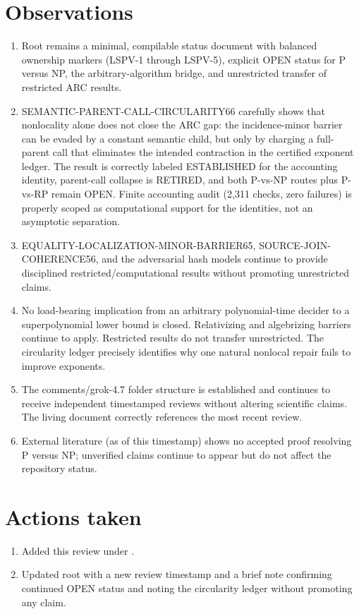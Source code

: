 \documentclass[11pt]{article}
\begin{document}
\section{Observations}
\begin{enumerate}
\item Root  remains a minimal, compilable status document with balanced ownership markers (LSPV-1 through LSPV-5), explicit OPEN status for P versus NP, the arbitrary-algorithm bridge, and unrestricted transfer of restricted ARC results.
\item SEMANTIC-PARENT-CALL-CIRCULARITY66 carefully shows that nonlocality alone does not close the ARC gap: the incidence-minor barrier can be evaded by a constant semantic child, but only by charging a full-parent call that eliminates the intended contraction in the certified exponent ledger. The result is correctly labeled ESTABLISHED for the accounting identity, parent-call collapse is RETIRED, and both P-vs-NP routes plus P-vs-RP remain OPEN. Finite accounting audit (2,311 checks, zero failures) is properly scoped as computational support for the identities, not an asymptotic separation.
\item EQUALITY-LOCALIZATION-MINOR-BARRIER65, SOURCE-JOIN-COHERENCE56, and the adversarial hash models continue to provide disciplined restricted/computational results without promoting unrestricted claims.
\item No load-bearing implication from an arbitrary polynomial-time decider to a superpolynomial lower bound is closed. Relativizing and algebrizing barriers continue to apply. Restricted results do not transfer unrestricted. The circularity ledger precisely identifies why one natural nonlocal repair fails to improve exponents.
\item The comments/grok-4.7 folder structure is established and continues to receive independent timestamped reviews without altering scientific claims. The living document correctly references the most recent review.
\item External literature (as of this timestamp) shows no accepted proof resolving P versus NP; unverified claims continue to appear but do not affect the repository status.
\end{enumerate}

\section{Actions taken}
\begin{enumerate}
\item Added this review under .
\item Updated root  with a new review timestamp and a brief note confirming continued OPEN status and noting the circularity ledger without promoting any claim.
\end{enumerate}
\end{document}
